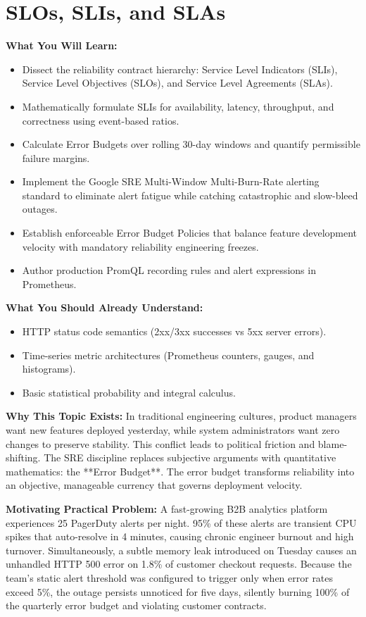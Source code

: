 \chapter{SLOs, SLIs, and SLAs}
\label{ch:slos-slis-slas}

\begin{chaptergoalsbox}
\textbf{What You Will Learn:}
\begin{itemize}[leftmargin=12pt]
  \item Dissect the reliability contract hierarchy: Service Level Indicators (SLIs), Service Level Objectives (SLOs), and Service Level Agreements (SLAs).
  \item Mathematically formulate SLIs for availability, latency, throughput, and correctness using event-based ratios.
  \item Calculate Error Budgets over rolling 30-day windows and quantify permissible failure margins.
  \item Implement the Google SRE Multi-Window Multi-Burn-Rate alerting standard to eliminate alert fatigue while catching catastrophic and slow-bleed outages.
  \item Establish enforceable Error Budget Policies that balance feature development velocity with mandatory reliability engineering freezes.
  \item Author production PromQL recording rules and alert expressions in Prometheus.
\end{itemize}

\textbf{What You Should Already Understand:}
\begin{itemize}[leftmargin=12pt]
  \item HTTP status code semantics (2xx/3xx successes vs 5xx server errors).
  \item Time-series metric architectures (Prometheus counters, gauges, and histograms).
  \item Basic statistical probability and integral calculus.
\end{itemize}

\textbf{Why This Topic Exists:}
In traditional engineering cultures, product managers want new features deployed yesterday, while system administrators want zero changes to preserve stability. This conflict leads to political friction and blame-shifting. The SRE discipline replaces subjective arguments with quantitative mathematics: the **Error Budget**. The error budget transforms reliability into an objective, manageable currency that governs deployment velocity.

\textbf{Motivating Practical Problem:}
A fast-growing B2B analytics platform experiences 25 PagerDuty alerts per night. 95\% of these alerts are transient CPU spikes that auto-resolve in 4 minutes, causing chronic engineer burnout and high turnover. Simultaneously, a subtle memory leak introduced on Tuesday causes an unhandled HTTP 500 error on 1.8\% of customer checkout requests. Because the team's static alert threshold was configured to trigger only when error rates exceed 5\%, the outage persists unnoticed for five days, silently burning 100\% of the quarterly error budget and violating customer contracts.
\end{chaptergoalsbox}

